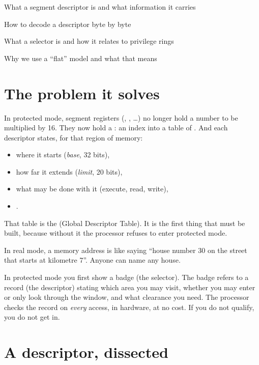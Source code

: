 \begin{goals}
  \item What a segment descriptor is and what information it carries
  \item How to decode a descriptor byte by byte
  \item What a selector is and how it relates to privilege rings
  \item Why we use a ``flat'' model and what that means
\end{goals}

\section{The problem it solves}

In protected mode, segment registers (, , \ldots) no longer hold a number
to be multiplied by 16. They now hold a : an index into a table of
. And each descriptor states, for that region of memory:

\begin{itemize}
  \item where it starts (\emph{base}, 32 bits),
  \item how far it extends (\emph{limit}, 20 bits),
  \item what may be done with it (execute, read, write),
  \item {}.
\end{itemize}

That table is the  (Global Descriptor Table). It is the first thing that must be built,
because without it the processor refuses to enter protected mode.

\begin{analogy}
In real mode, a memory address is like saying ``house number 30 on the street that starts at
kilometre 7''. Anyone can name any house.

In protected mode you first show a badge (the selector). The badge refers to a record (the
descriptor) stating which area you may visit, whether you may enter or only look through the
window, and what clearance you need. The processor checks the record on \emph{every} access, in
hardware, at no cost. If you do not qualify, you do not get in.
\end{analogy}

\section{A descriptor, dissected}

